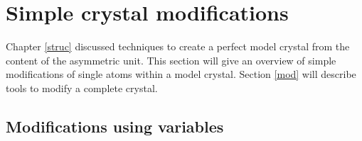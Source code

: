 
\chapter{Simple crystal modifications \label{mod-simple}}

Chapter \ref{struc} discussed techniques to create a 
perfect model crystal from the content of the asymmetric unit.
This section will give an overview of simple modifications of single
atoms within a model crystal.  Section \ref{mod} will describe
\Discus tools to modify a complete crystal.


\section{Modifications using variables \label{mod-var}}

